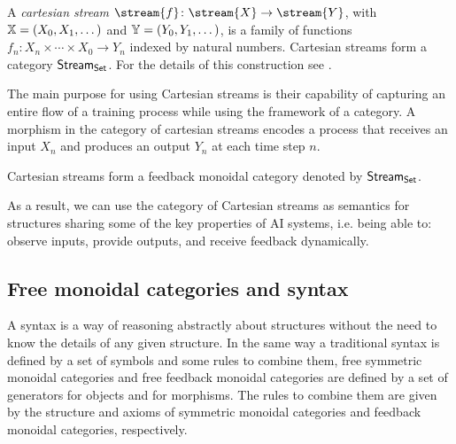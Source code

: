 \begin{definition}
A \emph{cartesian stream} \(\stream{f} \colon \stream{X} \to \stream{Y}\), with \(\mathbb{X} = (X_0, X_1, \dots)\) and \(\mathbb{Y} = (Y_0, Y_1, \dots)\), is a family of functions \(f_n \colon X_n \times \cdots \times X_0 \to Y_n\) indexed by natural numbers.
Cartesian streams form a category \(\mathsf{Stream}_{\mathsf{Set}}\).
For the details of this construction see .
\end{definition}

The main purpose for using Cartesian streams is their capability of capturing an entire flow of a training process while using the framework of a category.
A morphism in the category of cartesian streams encodes a process that receives an input \(X_n\) and produces an output \(Y_n\) at each time step \(n\).


\begin{proposition}
Cartesian streams form a feedback monoidal category denoted by \(\mathsf{Stream}_{\mathsf{Set}}\).
\end{proposition}

As a result, we can use the category of Cartesian streams as semantics for structures sharing some of the key properties of AI systems, i.e. being able to: observe inputs, provide outputs, and receive feedback dynamically.


\subsection{Free monoidal categories and syntax}
A syntax is a way of reasoning abstractly about structures without the need to know the details of any given structure.
In the same way a traditional syntax is defined by a set of symbols and some rules to combine them, free symmetric monoidal categories and free feedback monoidal categories are defined by a set of generators for objects and for morphisms.
The rules to combine them are given by the structure and axioms of symmetric monoidal categories and feedback monoidal categories, respectively.

